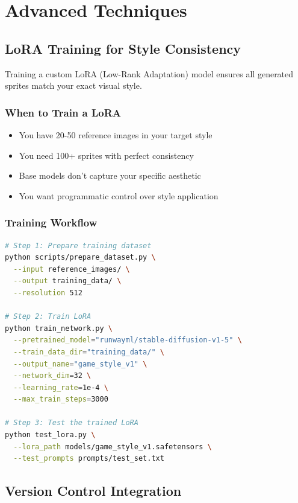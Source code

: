 \documentclass[11pt]{article}
\begin{document}
\section{Advanced Techniques}

\subsection{LoRA Training for Style Consistency}

Training a custom LoRA (Low-Rank Adaptation) model ensures all generated sprites match your exact visual style.

\subsubsection{When to Train a LoRA}

\begin{itemize}
    \item You have 20-50 reference images in your target style
    \item You need 100+ sprites with perfect consistency
    \item Base models don't capture your specific aesthetic
    \item You want programmatic control over style application
\end{itemize}

\subsubsection{Training Workflow}

\begin{lstlisting}[language=bash, caption={LoRA training process}]
# Step 1: Prepare training dataset
python scripts/prepare_dataset.py \
  --input reference_images/ \
  --output training_data/ \
  --resolution 512

# Step 2: Train LoRA
python train_network.py \
  --pretrained_model="runwayml/stable-diffusion-v1-5" \
  --train_data_dir="training_data/" \
  --output_name="game_style_v1" \
  --network_dim=32 \
  --learning_rate=1e-4 \
  --max_train_steps=3000

# Step 3: Test the trained LoRA
python test_lora.py \
  --lora_path models/game_style_v1.safetensors \
  --test_prompts prompts/test_set.txt
\end{lstlisting}

\subsection{Version Control Integration}
\end{document}
